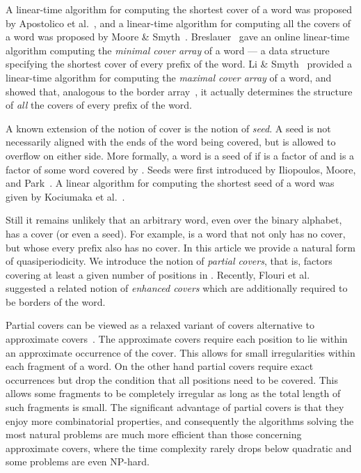 \documentclass{article}
\theoremstyle{theorem}
\theoremstyle{definition}
\begin{document}
    A linear-time algorithm for computing the shortest cover of a word was proposed
    by Apostolico et al.~\cite{DBLP:journals/ipl/ApostolicoFI91}, and a linear-time
    algorithm for computing all the covers of a word was proposed by
    Moore \& Smyth~\cite{DBLP:journals/ipl/MooreS94}. Breslauer~\cite{DBLP:journals/ipl/Breslauer92}
    gave an online linear-time algorithm computing the {\em minimal cover array} of a word --- a data 
    structure specifying the shortest cover of every prefix of the word.
    Li \& Smyth~\cite{DBLP:journals/algorithmica/LiS02} provided a linear-time algorithm
    for computing the {\em maximal cover array} of a word, and showed that, analogous to
    the border array~\cite{AlgorithmsOnStrings}, it actually determines the structure of {\em all} the covers of every prefix of the word.

    A known extension of the notion of cover is the notion of \emph{seed}.
    A seed is not necessarily aligned with the ends of the word being covered,
    but is allowed to overflow on either side.
    More formally, a word  is a seed of  if  is a factor of  and  is a factor of some
    word  covered by .
    Seeds were first introduced by Iliopoulos, Moore, and Park~\cite{DBLP:journals/algorithmica/IliopoulosMP96}.
    A linear algorithm for computing the shortest seed of a word was given
    by Kociumaka et al.~\cite{DBLP:conf/soda/KociumakaKRRW12}.

    Still it remains unlikely that an arbitrary word, even over the binary alphabet,
    has a cover (or even a seed).
    For example,  is a word that not only has no cover, 
    but whose every prefix also has no cover.    
    In this article we provide a natural form of quasiperiodicity.
    We introduce the notion of \emph{partial covers}, that is, factors covering at least a given number of positions in .
    Recently, Flouri et al.~\cite{Flouri2013102} suggested a related notion of \emph{enhanced covers}
    which are additionally required to be borders of the word.
    
    Partial covers can be viewed as a relaxed variant of covers
    alternative to approximate covers~\cite{SimParkKimLee}.
    The approximate covers require each position to lie within an
    approximate occurrence of the cover. This allows for small irregularities
    within each fragment of a word.
    On the other hand partial covers require exact occurrences but drop
    the condition that all positions need to be covered. This allows some
    fragments to be completely irregular as long as the total length of such
    fragments is small.
    The significant advantage of partial covers is that they enjoy more
    combinatorial properties, and consequently the algorithms solving the most
    natural problems are much more efficient than those concerning approximate
    covers, where the time complexity rarely drops below quadratic and
    some problems are even NP-hard. 
    
\end{document}

